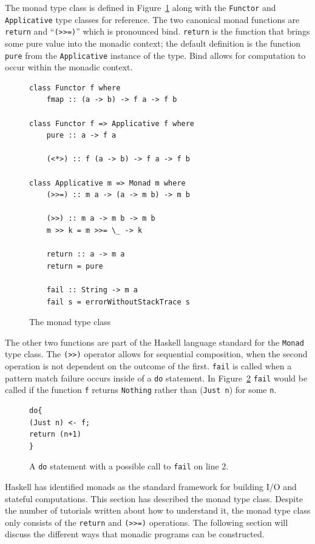 The monad type class is defined in Figure~\ref{monadDef} along with the \texttt{Functor} and \texttt{Applicative} type classes for reference. The two canonical monad functions are \texttt{return} and ``\texttt{(>>=)}'' which is pronounced bind. \texttt{return} is the function that brings some pure value into the monadic context; the default definition is the function \texttt{pure} from the \texttt{Applicative} instance of the type. Bind allows for computation to occur within the monadic context.

\begin{figure}[t]
\begin{lstlisting}
class Functor f where
	fmap :: (a -> b) -> f a -> f b

class Functor f => Applicative f where
	pure :: a -> f a
	
	(<*>) :: f (a -> b) -> f a -> f b

class Applicative m => Monad m where
	(>>=) :: m a -> (a -> m b) -> m b

	(>>) :: m a -> m b -> m b
	m >> k = m >>= \_ -> k
	
	return :: a -> m a
	return = pure
	
	fail :: String -> m a
	fail s = errorWithoutStackTrace s
\end{lstlisting}
\caption{The monad type class}
\label{monadDef}
\end{figure}

The other two functions are part of the Haskell language standard for the \texttt{Monad} type class. The \texttt{(>>)} operator allows for sequential composition, when the second operation is not dependent on the outcome of the first. \texttt{fail} is called when a pattern match failure occurs inside of a \texttt{do} statement. In Figure~\ref{failCall} \texttt{fail} would be called if the function \texttt{f} returns \texttt{Nothing} rather than (\texttt{Just n}) for some \texttt{n}.

\begin{figure}[t]
\begin{lstlisting}
do{
(Just n) <- f;
return (n+1)
}
\end{lstlisting}
\caption{A \texttt{do} statement with a possible call to \texttt{fail} on line 2.}
\label{failCall}
\end{figure}

Haskell has identified monads as the standard framework for building I/O and stateful computations. This section has described the monad type class. Despite the number of tutorials written about how to understand it, the monad type class only consists of the \texttt{return} and \texttt{(>>=)} operations. The following section will discuss the different ways that monadic programs can be constructed. 

